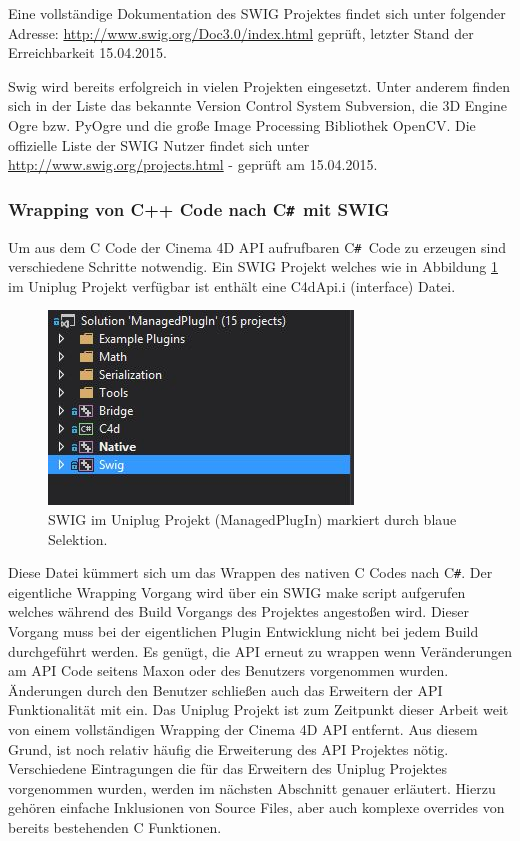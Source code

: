 \documentclass[pagesize, paper=a4, fontsize=12pt, titlepage=true, headings=small, headnosepline, abstractoff, liststotoc, nochapterprefix, plainheadsepline, twoside]{scrreprt}
\newcommand{\CS}{C\texttt{\#}}
\newcommand{\CSS}{C\texttt{\# }}
\newcommand{\CPPS}{C\nolinebreak\hspace{-.05em}\raisebox{.4ex}{\tiny\bf +}\nolinebreak\hspace{-.10em}\raisebox{.4ex}{\tiny\bf +} }
\begin{document}
Eine vollständige Dokumentation des SWIG Projektes findet sich unter folgender Adresse: \url{http://www.swig.org/Doc3.0/index.html} geprüft, letzter Stand der Erreichbarkeit 15.04.2015.

Swig wird bereits erfolgreich in vielen Projekten eingesetzt. Unter anderem finden sich in der Liste das bekannte Version Control System Subversion, die 3D Engine Ogre bzw. PyOgre und die große Image Processing Bibliothek OpenCV. Die offizielle Liste der SWIG Nutzer findet sich unter \url{http://www.swig.org/projects.html} - geprüft am 15.04.2015.

\subsubsection{Wrapping von C++ Code nach \CSS mit SWIG}


Um aus dem \CPPS Code der Cinema 4D API aufrufbaren \CSS Code zu erzeugen sind verschiedene Schritte notwendig. Ein SWIG Projekt welches wie in Abbildung \ref{SWIGUniplug} im Uniplug Projekt verfügbar ist enthält eine C4dApi.i (interface) Datei.

\begin{figure}[ht]
	\centering
	\includegraphics[width=\linewidth/2]{Bilder/ProjektstrukturSwig.JPG}
	\caption{SWIG im Uniplug Projekt (ManagedPlugIn) markiert durch blaue Selektion.}
	\label{SWIGUniplug}
\end{figure}

Diese Datei kümmert sich um das Wrappen des nativen \CPPS Codes nach \CS. Der eigentliche Wrapping Vorgang wird über ein SWIG make script aufgerufen welches während des Build Vorgangs des Projektes angestoßen wird. Dieser Vorgang muss bei der eigentlichen Plugin Entwicklung nicht bei jedem Build durchgeführt werden. Es genügt, die API erneut zu wrappen wenn Veränderungen am API Code seitens Maxon oder des Benutzers vorgenommen wurden. Änderungen durch den Benutzer schließen auch das Erweitern der API Funktionalität mit ein. Das Uniplug Projekt ist zum Zeitpunkt dieser Arbeit weit von einem vollständigen Wrapping der Cinema 4D API entfernt. Aus diesem Grund, ist noch relativ häufig die Erweiterung des API Projektes nötig. Verschiedene Eintragungen die für das Erweitern des Uniplug Projektes vorgenommen wurden, werden im nächsten Abschnitt genauer erläutert. Hierzu gehören einfache Inklusionen von Source Files, aber auch komplexe overrides von bereits bestehenden \CPPS Funktionen.
\end{document}
